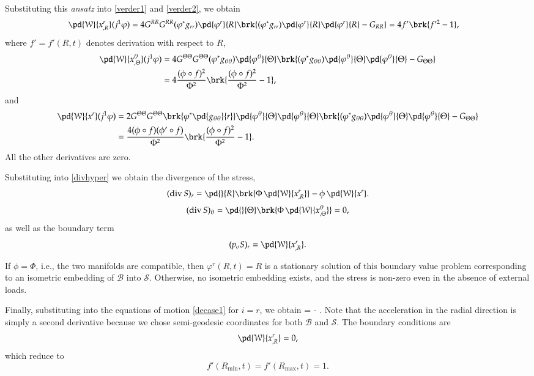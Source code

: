 \documentclass[smallextended]{svjour3}
\begin{document}
Substituting this \emph{ansatz} into \eqref{verder1} and \eqref{verder2}, we obtain 
\[
\begin{split}
\pd{\mathcal{W}}{x^r_{,R}}(j^1{\varphi}) &= 4 G^{RR} G^{RR} 
({\varphi}^*g_{rr})\pd{{\varphi}^r}{R} 
\brk{({\varphi}^*g_{rr})\pd{{\varphi}^r}{R}\pd{{\varphi}^r}{R} - G_{RR}} = 4 f' \brk{f'^2 - 1},
\end{split}
\]
where $f' = f'(R,t)$ denotes derivation with respect to $R$, 
\[
\begin{split}
\pd{\mathcal{W}}{x^\theta_{,\Theta}}(j^1{\varphi}) &= 4 G^{\Theta \Theta} G^{\Theta\Theta} 
({\varphi}^*g_{\theta\theta})\pd{{\varphi}^\theta}{\Theta} 
\brk{({\varphi}^*g_{\theta\theta})\pd{{\varphi}^\theta}{\Theta}\pd{{\varphi}^\theta}{\Theta} - G_{\Theta\Theta}} \\
&= 4\frac{(\phi\circ f)^2}{\Phi^2} \brk{\frac{(\phi\circ f)^2}{\Phi^2}  - 1} ,
\end{split}
\]
and
\[
\begin{split}
\pd{\mathcal{W}}{x^r}(j^1{\varphi}) &= 2 G^{\Theta\Theta} G^{\Theta\Theta} 
\brk{{\varphi}^*\pd{g_{\theta\theta}}{r}}\pd{{\varphi}^\theta}{\Theta}\pd{{\varphi}^\theta}{\Theta} 
\brk{({\varphi}^*g_{\theta\theta})\pd{{\varphi}^\theta}{\Theta}\pd{{\varphi}^\theta}{\Theta} - G_{\Theta\Theta}} \\
&= \frac{4(\phi\circ f)(\phi'\circ f)}{\Phi^2} \brk{\frac{(\phi\circ f)^2}{\Phi^2}  - 1}.
\end{split}
\]
All the other derivatives are zero.

Substituting into \eqref{divhyper} we obtain the divergence of the stress,
\[
(\operatorname{div} S)_r = 
\pd{}{R}\brk{\Phi \,\pd{\mathcal{W}}{x^r_{,R}}} - \phi\,\pd{\mathcal{W}}{x^r} .
\]
\[
(\operatorname{div} S)_\theta = \pd{}{\Theta}\brk{\Phi \,\pd{\mathcal{W}}{x^\theta_{,\Theta}}} = 0,
\]
as well as the boundary term
\[
(p_\sigma S)_r = \pd{\mathcal{W}}{x^r_{,R}}.
\]

If $\phi = \Phi$, i.e., the two manifolds are compatible, then ${\varphi}^r(R,t) = R$ is a stationary solution of this boundary value problem corresponding to an isometric embedding of ${\mathcal{B}}$ into ${\mathcal{S}}$. Otherwise, no isometric embedding exists, and the stress is non-zero even in the absence of external loads.

Finally, substituting into the equations of motion \eqref{decase1} for $i=r$, we obtain
\beq
{} =   {{\color{blue} {-}}} .
\label{the_wave_eq}
\eeq
Note that the acceleration in the radial direction is simply a second derivative because we chose semi-geodesic coordinates for both ${\mathcal{B}}$ and ${\mathcal{S}}$. 
The boundary conditions are
\[
\pd{\mathcal{W}}{x^r_{,R}} = 0,
\]
which reduce to
\[
f'({R_{\text{min}}},t) = f'({R_{\text{max}}},t) = 1.
\]
\end{document}
